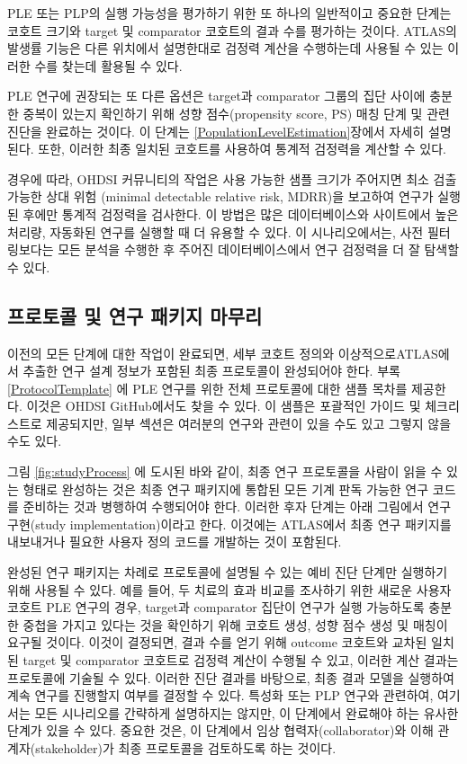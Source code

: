 \documentclass[11pt]{book}
\theoremstyle{definition}
\theoremstyle{definition}
\theoremstyle{definition}
\theoremstyle{remark}
\begin{document}
PLE 또는 PLP의 실행 가능성을 평가하기 위한 또 하나의 일반적이고 중요한
단계는 코호트 크기와 target 및 comparator 코호트의 결과 수를 평가하는
것이다. ATLAS의 발생률 기능은 다른 위치에서 설명한대로 검정력 계산을
수행하는데 사용될 수 있는 이러한 수를 찾는데 활용될 수 있다.

PLE 연구에 권장되는 또 다른 옵션은 target과 comparator 그룹의 집단
사이에 충분한 중복이 있는지 확인하기 위해 성향 점수(propensity score,
PS) 매칭 단계 및 관련 진단을 완료하는 것이다. 이 단계는
\ref{PopulationLevelEstimation}장에서 자세히 설명된다. 또한, 이러한 최종
일치된 코호트를 사용하여 통계적 검정력을 계산할 수 있다.

경우에 따라, OHDSI 커뮤니티의 작업은 사용 가능한 샘플 크기가 주어지면
최소 검출 가능한 상대 위험 (minimal detectable relative risk, MDRR)을
보고하여 연구가 실행된 후에만 통계적 검정력을 검사한다. 이 방법은 많은
데이터베이스와 사이트에서 높은 처리량, 자동화된 연구를 실행할 때 더
유용할 수 있다. 이 시나리오에서는, 사전 필터링보다는 모든 분석을 수행한
후 주어진 데이터베이스에서 연구 검정력을 더 잘 탐색할 수 있다.

\subsection{프로토콜 및 연구 패키지 마무리}\label{----}

이전의 모든 단계에 대한 작업이 완료되면, 세부 코호트 정의와
이상적으로ATLAS에서 추출한 연구 설계 정보가 포함된 최종 프로토콜이
완성되어야 한다. 부록 \ref{ProtocolTemplate} 에 PLE 연구를 위한 전체
프로토콜에 대한 샘플 목차를 제공한다. 이것은 OHDSI GitHub에서도 찾을 수
있다. 이 샘플은 포괄적인 가이드 및 체크리스트로 제공되지만, 일부 섹션은
여러분의 연구와 관련이 있을 수도 있고 그렇지 않을 수도 있다.

그림 \ref{fig:studyProcess} 에 도시된 바와 같이, 최종 연구 프로토콜을
사람이 읽을 수 있는 형태로 완성하는 것은 최종 연구 패키지에 통합된 모든
기계 판독 가능한 연구 코드를 준비하는 것과 병행하여 수행되어야 한다.
이러한 후자 단계는 아래 그림에서 연구 구현(study implementation)이라고
한다. 이것에는 ATLAS에서 최종 연구 패키지를 내보내거나 필요한 사용자
정의 코드를 개발하는 것이 포함된다.

완성된 연구 패키지는 차례로 프로토콜에 설명될 수 있는 예비 진단 단계만
실행하기 위해 사용될 수 있다. 예를 들어, 두 치료의 효과 비교를 조사하기
위한 새로운 사용자 코호트 PLE 연구의 경우, target과 comparator 집단이
연구가 실행 가능하도록 충분한 중첩을 가지고 있다는 것을 확인하기 위해
코호트 생성, 성향 점수 생성 및 매칭이 요구될 것이다. 이것이 결정되면,
결과 수를 얻기 위해 outcome 코호트와 교차된 일치된 target 및 comparator
코호트로 검정력 계산이 수행될 수 있고, 이러한 계산 결과는 프로토콜에
기술될 수 있다. 이러한 진단 결과를 바탕으로, 최종 결과 모델을 실행하여
계속 연구를 진행할지 여부를 결정할 수 있다. 특성화 또는 PLP 연구와
관련하여, 여기서는 모든 시나리오를 간략하게 설명하지는 않지만, 이
단계에서 완료해야 하는 유사한 단계가 있을 수 있다. 중요한 것은, 이
단계에서 임상 협력자(collaborator)와 이해 관계자(stakeholder)가 최종
프로토콜을 검토하도록 하는 것이다.
\end{document}

